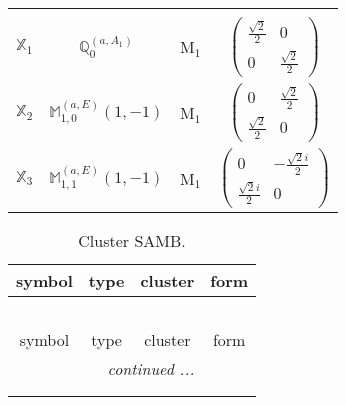 \documentclass[fleqn,10pt,landscape]{article}
\begin{document}
\begin{itemize}
\begin{center}
\begin{longtable}{c|c|c|c}
 \hline \hline
\multicolumn{3}{r}{} \\ \endlastfoot

$ \mathbb{X}_{1} $ & $\mathbb{Q}_{0}^{(a,A_{1})}$ & M$_{1}$ & $\begin{pmatrix} \frac{\sqrt{2}}{2} & 0 \\ 0 & \frac{\sqrt{2}}{2} \end{pmatrix}$ \\
$ \mathbb{X}_{2} $ & $\mathbb{M}_{1,0}^{(a,E)}(1,-1)$ & M$_{1}$ & $\begin{pmatrix} 0 & \frac{\sqrt{2}}{2} \\ \frac{\sqrt{2}}{2} & 0 \end{pmatrix}$ \\
$ \mathbb{X}_{3} $ & $\mathbb{M}_{1,1}^{(a,E)}(1,-1)$ & M$_{1}$ & $\begin{pmatrix} 0 & - \frac{\sqrt{2} i}{2} \\ \frac{\sqrt{2} i}{2} & 0 \end{pmatrix}$ \\
\end{longtable}
\end{center}
\begin{center}
\renewcommand{\arraystretch}{1.3}
\begin{longtable}{c|c|c|c}
\caption{Cluster SAMB.}
 \\
 \hline \hline
symbol & type & cluster & form \\ \hline \endfirsthead

\multicolumn{3}{l}{\tablename\ \thetable{}} \\
 \hline \hline
symbol & type & cluster & form \\ \hline \endhead

 \hline \hline
\multicolumn{3}{r}{\footnotesize\it continued ...} \\ \endfoot

 \hline \hline
\multicolumn{3}{r}{} \\ \endlastfoot


\end{longtable}
\end{center}
\end{itemize}
\end{document}
